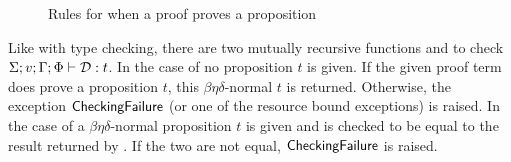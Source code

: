 \begin{figure}
\begin{center}
\end{center}
\caption{Rules for when a proof proves a proposition}\label{fig:pf}
\end{figure}

Like with type checking, there are two mutually recursive functions
{} and {}
to check
$\Sigma;v;\Gamma;\Phi\vdash \mathcal{D} : t$.
In the case of {} no proposition $t$ is given.
If the given proof term does prove a proposition $t$, this $\beta\eta\delta$-normal $t$ is
returned. Otherwise, the exception $\exc{CheckingFailure}$ (or one of the resource bound exceptions) is raised.
In the case of {} a $\beta\eta\delta$-normal proposition $t$ is given
and is checked to be equal to the result returned by {}.
If the two are not equal, $\exc{CheckingFailure}$ is raised.

